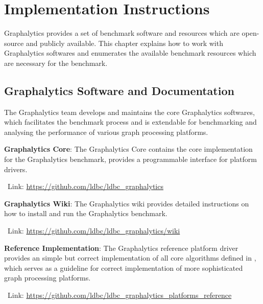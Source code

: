 \chapter{Implementation Instructions}
\label{chap:instructions}
Graphalytics provides a set of benchmark software and resources which are open-source and publicly available. This chapter explains how to work with Graphalytics softwares and enumerates the available benchmark resources which are necessary for the benchmark.



\section{Graphalytics Software and Documentation}\label{sec:instructions:core}
The Graphalytics team develops and maintains the core Graphalytics softwares, which facilitates the benchmark process and is extendable for benchmarking and analysing the performance of various graph processing platforms.

\textbf{Graphalytics Core}: The Graphalytics Core contains the core implementation for the Graphalytics benchmark, provides a programmable interface for platform drivers.

\-\ Link: \url{https://github.com/ldbc/ldbc_graphalytics}


\textbf{Graphalytics Wiki}: The Graphalytics wiki provides detailed instructions on how to install and run the Graphalytics benchmark.

\-\ Link: \url{https://github.com/ldbc/ldbc_graphalytics/wiki}




\textbf{Reference Implementation}: The Graphalytics reference platform driver provides an simple but correct implementation of all core algorithms defined in , which serves as a guideline for correct implementation of more sophisticated graph processing platforms.

\-\ Link: \url{https://github.com/ldbc/ldbc_graphalytics_platforms_reference}









